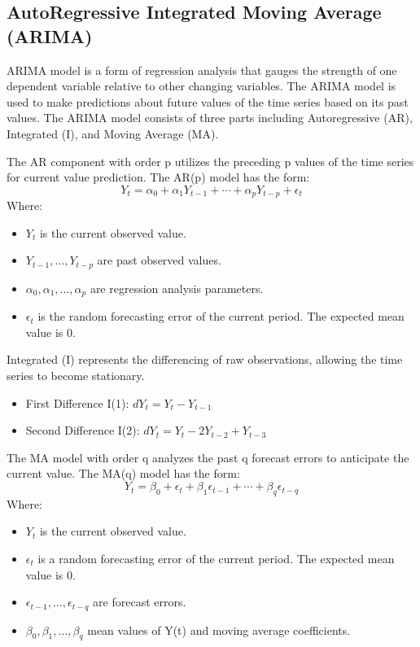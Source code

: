 \documentclass{ieeeojies}
\begin{document}
 \subsection{AutoRegressive Integrated Moving Average (ARIMA)}
 ARIMA model is a form of regression analysis that gauges the strength of one dependent variable relative to other changing variables. The ARIMA model is used to make predictions about future values of the time series based on its past values. The ARIMA model consists of three parts including Autoregressive (AR), Integrated (I), and Moving Average (MA).\par
\noindent
 The AR component with order p utilizes the preceding p values of the time series for current value prediction. The AR(p) model has the form:
 \[Y_t=\alpha_0+\alpha_1Y_{t-1}+\cdots+\alpha_pY_{t-p}+\epsilon_t\]
Where:
    \begin{itemize}
	\item $Y_t$ is the current observed value.
        \item $Y_{t-1}, \ldots, Y_{t-p}$ are past observed values.
        \item $\alpha_0, \alpha_1, \ldots, \alpha_p$ are regression analysis parameters.
        \item $\epsilon_t$ is the random forecasting error of the current period. The expected mean value is 0.
    \end{itemize}
 Integrated (I) represents the differencing of raw observations, allowing the time series to become stationary.
 \begin{itemize}
    \item First Difference I(1): $dY_t = Y_t - Y_{t-1}$
    \item Second Difference I(2): $dY_t = Y_t - 2Y_{t-2} + Y_{t-3}$
 \end{itemize}
The MA model with order q analyzes the past q forecast errors to anticipate the current value. The MA(q) model has the form:
  \[Y_t=\beta_0+\epsilon_t+\beta_1\epsilon_{t-1}+\cdots+\beta_q\epsilon_{t-q}\]
        Where:
        \begin{itemize}
	    \item $Y_t$ is the current observed value.
            \item $\epsilon_t$ is a random forecasting error of the current period. The expected mean value is 0.
            \item \(\epsilon_{t-1}, \ldots, \epsilon_{t-q}\) are forecast errors.
            \item \(\beta_0, \beta_1, \ldots, \beta_q\) mean values of Y(t) and moving average coefficients.
            \end{itemize}
            
\end{document}
